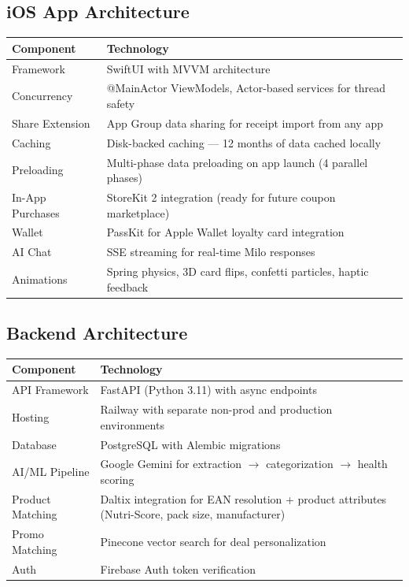 \documentclass[11pt,a4paper]{article}
\begin{document}
\subsection{iOS App Architecture}

\begin{center}
\renewcommand{\arraystretch}{1.3}
\begin{tabularx}{\textwidth}{L{3.5cm} L{10cm}}
\toprule
{}
\textbf{\color{white}Component} & \textbf{\color{white}Technology} \\
\midrule
Framework & SwiftUI with MVVM architecture \\
Concurrency & @MainActor ViewModels, Actor-based services for thread safety \\
Share Extension & App Group data sharing for receipt import from any app \\
Caching & Disk-backed caching --- 12 months of data cached locally \\
Preloading & Multi-phase data preloading on app launch (4 parallel phases) \\
In-App Purchases & StoreKit 2 integration (ready for future coupon marketplace) \\
Wallet & PassKit for Apple Wallet loyalty card integration \\
AI Chat & SSE streaming for real-time Milo responses \\
Animations & Spring physics, 3D card flips, confetti particles, haptic feedback \\
\bottomrule
\end{tabularx}
\end{center}

\subsection{Backend Architecture}

\begin{center}
\renewcommand{\arraystretch}{1.3}
\begin{tabularx}{\textwidth}{L{3.5cm} L{10cm}}
\toprule
{}
\textbf{\color{white}Component} & \textbf{\color{white}Technology} \\
\midrule
API Framework & FastAPI (Python 3.11) with async endpoints \\
Hosting & Railway with separate non-prod and production environments \\
Database & PostgreSQL with Alembic migrations \\
AI/ML Pipeline & Google Gemini for extraction $\rightarrow$ categorization $\rightarrow$ health scoring \\
Product Matching & Daltix integration for EAN resolution + product attributes (Nutri-Score, pack size, manufacturer) \\
Promo Matching & Pinecone vector search for deal personalization \\
Auth & Firebase Auth token verification \\
\bottomrule
\end{tabularx}
\end{center}
\end{document}
